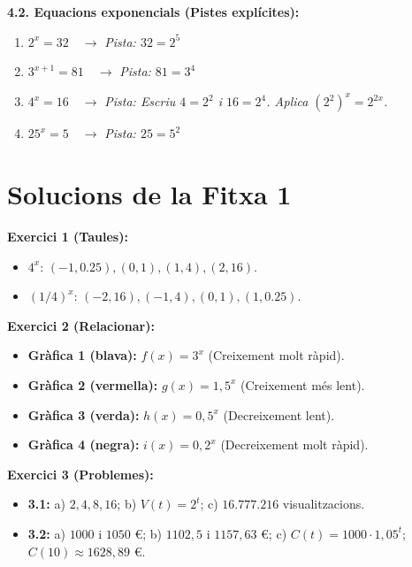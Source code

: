 \documentclass[12pt,a4paper]{article}
\begin{document}
\vspace{0.5cm}

\textbf{4.2. Equacions exponencials (Pistes explícites):}
\begin{enumerate}[label=\alph*)]
    \item $2^x = 32 \quad \to$ \textit{Pista: $32 = 2^5$}
    \item $3^{x+1} = 81 \quad \to$ \textit{Pista: $81 = 3^4$}
    \item $4^x = 16 \quad \to$ \textit{Pista: Escriu $4 = 2^2$ i $16 = 2^4$. Aplica $(2^2)^x = 2^{2x}$.}
    \item $25^x = 5 \quad \to$ \textit{Pista: $25 = 5^2$}
\end{enumerate}

\newpage
\section*{Solucions de la Fitxa 1}

\textbf{Exercici 1 (Taules):}
\begin{itemize}
    \item $4^x$: $(-1, 0.25), (0, 1), (1, 4), (2, 16)$.
    \item $(1/4)^x$: $(-2, 16), (-1, 4), (0, 1), (1, 0.25)$.
\end{itemize}

\textbf{Exercici 2 (Relacionar):}
\begin{itemize}
    \item \textbf{Gràfica 1 (blava):} $f(x) = 3^x$ (Creixement molt ràpid).
    \item \textbf{Gràfica 2 (vermella):} $g(x) = 1,5^x$ (Creixement més lent).
    \item \textbf{Gràfica 3 (verda):} $h(x) = 0,5^x$ (Decreixement lent).
    \item \textbf{Gràfica 4 (negra):} $i(x) = 0,2^x$ (Decreixement molt ràpid).
\end{itemize}

\textbf{Exercici 3 (Problemes):}
\begin{itemize}
    \item \textbf{3.1:} a) $2, 4, 8, 16$; b) $V(t) = 2^t$; c) $16.777.216$ visualitzacions.
    \item \textbf{3.2:} a) $1000$ i $1050$ €; b) $1102,5$ i $1157,63$ €; c) $C(t) = 1000 \cdot 1,05^t$; $C(10) \approx 1628,89$ €.
\end{itemize}
\end{document}
